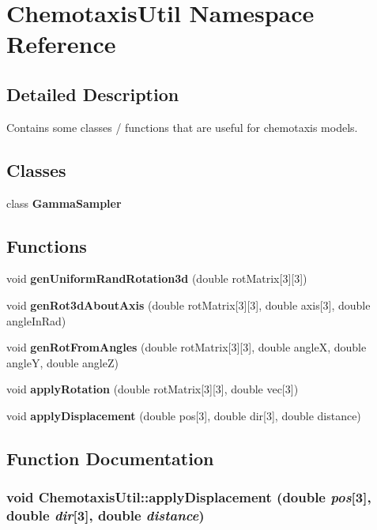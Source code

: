 \section{ChemotaxisUtil Namespace Reference}
\label{namespaceChemotaxisUtil}


\subsection{Detailed Description}
Contains some classes / functions that are useful for chemotaxis models. 



\subsection*{Classes}
\begin{CompactItemize}
\item 
class {\bf GammaSampler}
\end{CompactItemize}
\subsection*{Functions}
\begin{CompactItemize}
\item 
void {\bf genUniformRandRotation3d} (double rotMatrix[3][3])
\item 
void {\bf genRot3dAboutAxis} (double rotMatrix[3][3], double axis[3], double angleInRad)
\item 
void {\bf genRotFromAngles} (double rotMatrix[3][3], double angleX, double angleY, double angleZ)
\item 
void {\bf applyRotation} (double rotMatrix[3][3], double vec[3])
\item 
void {\bf applyDisplacement} (double pos[3], double dir[3], double distance)
\end{CompactItemize}


\subsection{Function Documentation}
\subsubsection{\setlength{\rightskip}{0pt plus 5cm}void ChemotaxisUtil::applyDisplacement (double {\em pos}[3], double {\em dir}[3], double {\em distance})}\label{namespaceChemotaxisUtil_c76aff7066bc13bc805a6c89083e4f1b}


